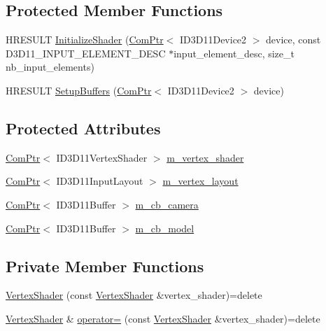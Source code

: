 \subsection*{Protected Member Functions}
\begin{DoxyCompactItemize}
\item 
H\+R\+E\+S\+U\+LT \hyperlink{classmage_1_1_vertex_shader_a0935c21454b9776ebe644c9290e06e54}{Initialize\+Shader} (\hyperlink{namespacemage_ae74f374780900893caa5555d1031fd79}{Com\+Ptr}$<$ I\+D3\+D11\+Device2 $>$ device, const D3\+D11\+\_\+\+I\+N\+P\+U\+T\+\_\+\+E\+L\+E\+M\+E\+N\+T\+\_\+\+D\+E\+SC $\ast$input\+\_\+element\+\_\+desc, size\+\_\+t nb\+\_\+input\+\_\+elements)
\item 
H\+R\+E\+S\+U\+LT \hyperlink{classmage_1_1_vertex_shader_a02dec5ca8d933365397400da6046cdad}{Setup\+Buffers} (\hyperlink{namespacemage_ae74f374780900893caa5555d1031fd79}{Com\+Ptr}$<$ I\+D3\+D11\+Device2 $>$ device)
\end{DoxyCompactItemize}
\subsection*{Protected Attributes}
\begin{DoxyCompactItemize}
\item 
\hyperlink{namespacemage_ae74f374780900893caa5555d1031fd79}{Com\+Ptr}$<$ I\+D3\+D11\+Vertex\+Shader $>$ \hyperlink{classmage_1_1_vertex_shader_a0b2b02abae4cb226c115d7f1c5464a54}{m\+\_\+vertex\+\_\+shader}
\item 
\hyperlink{namespacemage_ae74f374780900893caa5555d1031fd79}{Com\+Ptr}$<$ I\+D3\+D11\+Input\+Layout $>$ \hyperlink{classmage_1_1_vertex_shader_a9b9895650b8c7f80af846d75f7d9ddda}{m\+\_\+vertex\+\_\+layout}
\item 
\hyperlink{namespacemage_ae74f374780900893caa5555d1031fd79}{Com\+Ptr}$<$ I\+D3\+D11\+Buffer $>$ \hyperlink{classmage_1_1_vertex_shader_a347cc37b799fe3b081b312a1bbd8ce24}{m\+\_\+cb\+\_\+camera}
\item 
\hyperlink{namespacemage_ae74f374780900893caa5555d1031fd79}{Com\+Ptr}$<$ I\+D3\+D11\+Buffer $>$ \hyperlink{classmage_1_1_vertex_shader_a248495ee84e17e46327de461638f051e}{m\+\_\+cb\+\_\+model}
\end{DoxyCompactItemize}
\subsection*{Private Member Functions}
\begin{DoxyCompactItemize}
\item 
\hyperlink{classmage_1_1_vertex_shader_a713f8581278ea2e5eb3010207b7e42a8}{Vertex\+Shader} (const \hyperlink{classmage_1_1_vertex_shader}{Vertex\+Shader} \&vertex\+\_\+shader)=delete
\item 
\hyperlink{classmage_1_1_vertex_shader}{Vertex\+Shader} \& \hyperlink{classmage_1_1_vertex_shader_a0094f5c2adb8377fa5c8d52e7a65136f}{operator=} (const \hyperlink{classmage_1_1_vertex_shader}{Vertex\+Shader} \&vertex\+\_\+shader)=delete
\end{DoxyCompactItemize}


